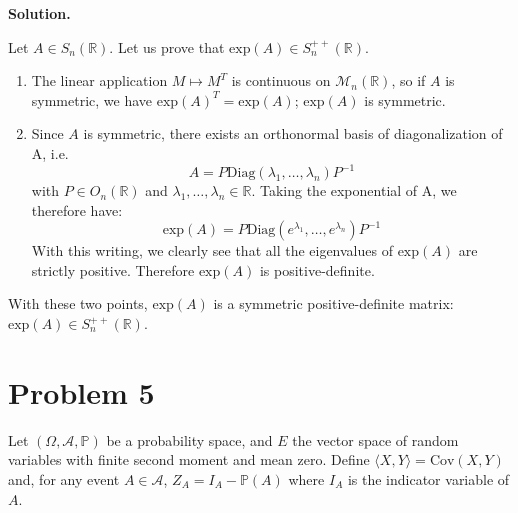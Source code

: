 \documentclass[12pt]{article}
\newcommand{\R}{\mathbb{R}}
\newcommand{\Exp}[1]{\text{exp}(#1)}
\newcommand{\Diag}[1]{\text{Diag}(#1)}
\newcommand{\Cov}[1]{\text{Cov}(#1)}
\newenvironment{solution}{\vspace{0.2cm} \textbf{Solution.}}{}
\begin{document}
	\begin{solution}
		
	Let $A \in S_n(\R)$. Let us prove that $\Exp{A} \in S_n^{++}(\R)$.
	\begin{enumerate}[label={\arabic*.}]
		\item The linear application $M \mapsto M^T$ is continuous on $\mathcal{M}_n(\R)$, so if $A$ is symmetric, we have $\Exp{A}^T = \Exp{A}$; $\Exp{A}$ is symmetric.
		\item Since $A$ is symmetric, there exists an orthonormal basis of diagonalization of A, i.e.\:
		$$ A = P \Diag{\lambda_1, \ldots, \lambda_n} P^{-1}$$
		with $P \in O_n(\R)$ and $\lambda_1,\ldots,\lambda_n \in \R$.
		Taking the exponential of A, we therefore have:
		$$ \Exp{A} = P \Diag{e^{\lambda_1}, \ldots, e^{\lambda_n}} P^{-1}$$
		With this writing, we clearly see that all the eigenvalues of $\Exp{A}$ are strictly positive. Therefore $\Exp{A}$ is positive-definite.
	\end{enumerate}
	
	With these two points, $\Exp{A}$ is a symmetric positive-definite matrix: $\Exp{A} \in S_n^{++}(\R)$.
	\end{solution}
	
\newpage

	\section*{Problem 5}

Let $(\Omega, \mathcal{A}, \mathbb{P})$ be a probability space, and $E$ the vector space of random variables with finite second moment and mean zero. Define $\langle X, Y \rangle = \Cov{X, Y}$ and, for any event $A \in \mathcal{A}$, $Z_A = I_A - \mathbb{P}(A)$ where $I_A$ is the indicator variable of $A$.
\end{document}
